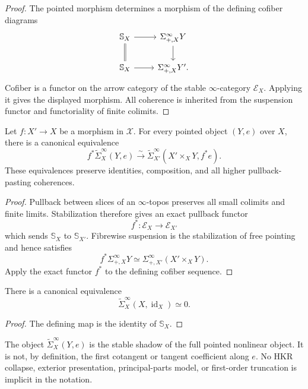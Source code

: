 \begin{proof}
The pointed morphism determines a morphism of the defining cofiber diagrams
\[
\begin{tikzcd}
\mathbb S_X \arrow[r] \arrow[d,equal] &
\Sigma^\infty_{+,X}Y \arrow[d]\\
\mathbb S_X \arrow[r] &
\Sigma^\infty_{+,X}Y'.
\end{tikzcd}
\]
Cofiber is a functor on the arrow category of the stable $\infty$-category
$\mathcal E_X$.  Applying it gives the displayed morphism.  All coherence is
inherited from the suspension functor and functoriality of finite colimits.
\end{proof}

\begin{proposition}
\label{prop:bnla-reduced-stabilization-base-change}
Let $f:X'\to X$ be a morphism in $\mathcal X$.  For every pointed object
$(Y,e)$ over $X$, there is a canonical equivalence
\[
    f^*\widetilde\Sigma^\infty_X(Y,e)
    \xrightarrow{\sim}
    \widetilde\Sigma^\infty_{X'}
    \left(
        X'\times_XY,
        f^*e
    \right).
\]
These equivalences preserve identities, composition, and all higher
pullback-pasting coherences.
\end{proposition}

\begin{proof}
Pullback between slices of an $\infty$-topos preserves all small colimits and
finite limits.  Stabilization therefore gives an exact pullback functor
\[
    f^*:\mathcal E_X\longrightarrow\mathcal E_{X'}
\]
which sends $\mathbb S_X$ to $\mathbb S_{X'}$.  Fibrewise suspension is the
stabilization of free pointing and hence satisfies
\[
    f^*\Sigma^\infty_{+,X}Y
    \simeq
    \Sigma^\infty_{+,X'}(X'\times_XY).
\]
Apply the exact functor $f^*$ to the defining cofiber sequence.
\end{proof}

\begin{lemma}
\label{lem:bnla-reduced-identity-zero}
There is a canonical equivalence
\[
    \widetilde\Sigma^\infty_X(X,\operatorname{id}_X)
    \simeq 0.
\]
\end{lemma}

\begin{proof}
The defining map is the identity of $\mathbb S_X$.
\end{proof}

\begin{remark}
\label{rem:bnla-stable-not-tangent}
The object $\widetilde\Sigma^\infty_X(Y,e)$ is the stable shadow of the full
pointed nonlinear object.  It is not, by definition, the first cotangent or
tangent coefficient along $e$.  No HKR collapse, exterior presentation,
principal-parts model, or first-order truncation is implicit in the notation.
\end{remark}


